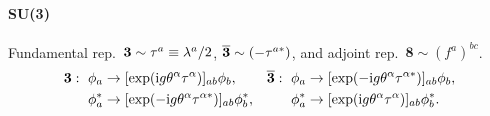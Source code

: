 \documentclass[CheatSheet]{subfiles}
\begin{document}
\paragraph{SU(3)} Fundamental rep.~$\bm 3\sim\tau^a\equiv \lambda^a/2$, $\overline{\bm 3}\sim(-\tau^{a*})$, and adjoint rep.~$\boldsymbol8\sim (f^a)^{bc}$.
\begin{align}\notag
\bm 3:~\phi_a&
  \to [\exp(\mathrm{i} g \theta^\alpha \tau^\alpha)]_{ab}\phi_b,
&
\overline{\bm 3}:~\phi_a&
  \to[\exp(-\mathrm{i} g \theta^\alpha \tau^{\alpha*})]_{ab}\phi_b,
\\
\phi_a^*&
  \to[\exp(-\mathrm{i} g \theta^\alpha \tau^{\alpha*})]_{ab}\phi_b^*,
&
\phi_a^*&
  \to[\exp(\mathrm{i} g \theta^\alpha \tau^{\alpha})]_{ab}\phi_b^*.
\end{align}

\clearpage
\detailstyle
\end{document}
